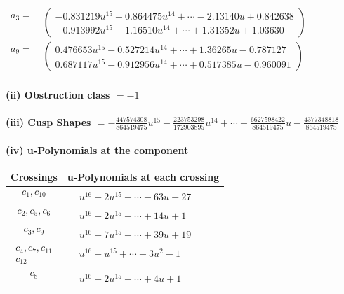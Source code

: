 \documentclass[1p]{elsarticle_modified}
\theoremstyle{definition}
\begin{document}
\begin{tabular}{m{7pt} m{180pt} m{7pt} m{180pt} }
\flushright $a_{3}=$&$\begin{pmatrix}-0.831219 u^{15}+0.864475 u^{14}+\cdots-2.13140 u+0.842638\\-0.913992 u^{15}+1.16510 u^{14}+\cdots+1.31352 u+1.03630\end{pmatrix}$ \\
\flushright $a_{9}=$&$\begin{pmatrix}0.476653 u^{15}-0.527214 u^{14}+\cdots+1.36265 u-0.787127\\0.687117 u^{15}-0.912956 u^{14}+\cdots+0.517385 u-0.960091\end{pmatrix}$\\&\end{tabular}
\flushleft \textbf{(ii) Obstruction class $= -1$}\\~\\
\flushleft \textbf{(iii) Cusp Shapes $= -\frac{447574308}{864519475} u^{15}-\frac{223753298}{172903895} u^{14}+\cdots+\frac{6627598422}{864519475} u-\frac{4377348818}{864519475}$}\\~\\
\newpage\renewcommand{\arraystretch}{1}
\flushleft \textbf{(iv) u-Polynomials at the component}\newline \\
\begin{tabular}{m{50pt}|m{274pt}}
Crossings & \hspace{64pt}u-Polynomials at each crossing \\
\hline $$\begin{aligned}c_{1},c_{10}\end{aligned}$$&$\begin{aligned}
&u^{16}-2 u^{15}+\cdots-63 u-27
\end{aligned}$\\
\hline $$\begin{aligned}c_{2},c_{5},c_{6}\end{aligned}$$&$\begin{aligned}
&u^{16}+2 u^{15}+\cdots+14 u+1
\end{aligned}$\\
\hline $$\begin{aligned}c_{3},c_{9}\end{aligned}$$&$\begin{aligned}
&u^{16}+7 u^{15}+\cdots+39 u+19
\end{aligned}$\\
\hline $$\begin{aligned}c_{4},c_{7},c_{11}\\c_{12}\end{aligned}$$&$\begin{aligned}
&u^{16}+u^{15}+\cdots-3 u^2-1
\end{aligned}$\\
\hline $$\begin{aligned}c_{8}\end{aligned}$$&$\begin{aligned}
&u^{16}+2 u^{15}+\cdots+4 u+1
\end{aligned}$\\
\hline
\end{tabular}\\~\\
\end{document}
